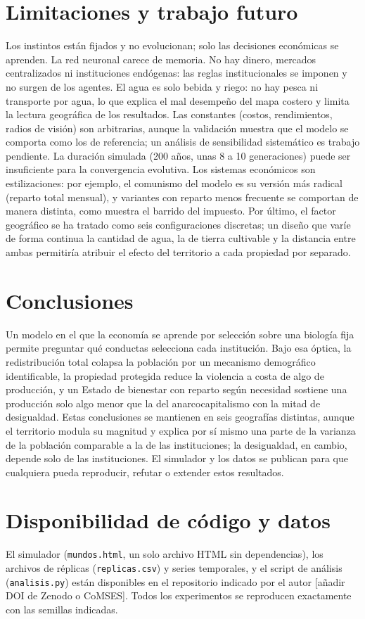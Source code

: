 \documentclass[11pt,a4paper]{article}
\begin{document}
\section{Limitaciones y trabajo futuro}
Los instintos están fijados y no evolucionan; solo las decisiones económicas se aprenden. La red neuronal carece de memoria. No hay dinero, mercados centralizados ni instituciones endógenas: las reglas institucionales se imponen y no surgen de los agentes. El agua es solo bebida y riego: no hay pesca ni transporte por agua, lo que explica el mal desempeño del mapa costero y limita la lectura geográfica de los resultados. Las constantes (costos, rendimientos, radios de visión) son arbitrarias, aunque la validación muestra que el modelo se comporta como los de referencia; un análisis de sensibilidad sistemático es trabajo pendiente. La duración simulada (200 años, unas 8 a 10 generaciones) puede ser insuficiente para la convergencia evolutiva. Los sistemas económicos son estilizaciones: por ejemplo, el comunismo del modelo es su versión más radical (reparto total mensual), y variantes con reparto menos frecuente se comportan de manera distinta, como muestra el barrido del impuesto. Por último, el factor geográfico se ha tratado como seis configuraciones discretas; un diseño que varíe de forma continua la cantidad de agua, la de tierra cultivable y la distancia entre ambas permitiría atribuir el efecto del territorio a cada propiedad por separado.

\section{Conclusiones}
Un modelo en el que la economía se aprende por selección sobre una biología fija permite preguntar qué conductas selecciona cada institución. Bajo esa óptica, la redistribución total colapsa la población por un mecanismo demográfico identificable, la propiedad protegida reduce la violencia a costa de algo de producción, y un Estado de bienestar con reparto según necesidad sostiene una producción solo algo menor que la del anarcocapitalismo con la mitad de desigualdad. Estas conclusiones se mantienen en seis geografías distintas, aunque el territorio modula su magnitud y explica por sí mismo una parte de la varianza de la población comparable a la de las instituciones; la desigualdad, en cambio, depende solo de las instituciones. El simulador y los datos se publican para que cualquiera pueda reproducir, refutar o extender estos resultados.

\section*{Disponibilidad de código y datos}
El simulador (\texttt{mundos.html}, un solo archivo HTML sin dependencias), los archivos de réplicas (\texttt{replicas.csv}) y series temporales, y el script de análisis (\texttt{analisis.py}) están disponibles en el repositorio indicado por el autor [añadir DOI de Zenodo o CoMSES]. Todos los experimentos se reproducen exactamente con las semillas indicadas.



\end{document}
